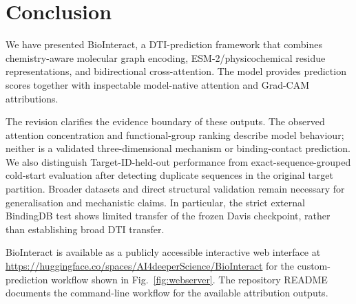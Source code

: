 \documentclass[fleqn,10pt]{wlscirep}
\begin{document}
\section{Conclusion}
\label{sec:conclusion}

We have presented BioInteract, a DTI-prediction framework that combines
chemistry-aware molecular graph encoding, ESM-2/physicochemical residue
representations, and bidirectional cross-attention.  The model provides
prediction scores together with inspectable model-native attention and Grad-CAM
attributions.

The revision clarifies the evidence boundary of these outputs.  The observed
attention concentration and functional-group ranking describe model behaviour;
neither is a validated three-dimensional mechanism or binding-contact prediction.
We also distinguish \begingroup\color{red}Target-ID-held-out\endgroup{} performance
from exact-sequence-grouped cold-start evaluation after detecting duplicate
sequences in the original target partition.  Broader datasets and direct
structural validation remain necessary for generalisation and mechanistic claims.
\begingroup\color{red} In particular, the strict external BindingDB test shows limited transfer of the
frozen Davis checkpoint, rather than establishing broad DTI transfer.\endgroup

BioInteract is available as a publicly accessible interactive web interface at
\url{https://huggingface.co/spaces/AI4deeperScience/BioInteract} for the
custom-prediction workflow shown in Fig.~\ref{fig:webserver}.  The repository
README documents the command-line workflow for the available attribution
outputs.
\end{document}
